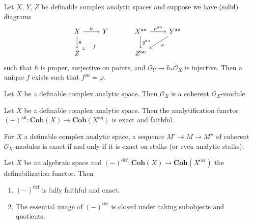 \documentclass[
	fontsize=10pt, %
]{kaohandt}
\newcommand{\definable}{\mathrm{def}}
\newcommand{\analytic}{\mathrm{an}}
\begin{document}
\begin{proposition}
    Let $X$, $Y$, $Z$ be definable complex analytic spaces and
    suppose we have (solid) diagrams
    \[
    \begin{tikzcd}
        X \ar[r,"h"] \ar[d,"g"] & Y\ar[dl,"f",dotted] \\ Z 
    \end{tikzcd}
    \hspace*{30pt}
    \begin{tikzcd}
        X^{\analytic} \ar[r,"h^{\analytic}"] \ar[d,"g^{\analytic}"] & Y^{\analytic}\ar[dl,"\varphi"] \\ Z^{\analytic} 
    \end{tikzcd}
    \]
    such that $h$ is proper, surjective on points,
    and $\mathcal{O}_Y \to h_*\mathcal{O}_X$ is injective.
    Then a unique $f$ exists such that $f^{\analytic} = \varphi$.
\end{proposition}

\begin{theorem}
    Let $X$ be a definable complex analytic space.
    Then $\mathcal{O}_X$ is a coherent $\mathcal{O}_X$-module.
\end{theorem}

\begin{theorem}
    Let $X$ be a definable complex analytic space.
    Then the analytification functor 
    $(-)^{\analytic}: \mathbf{Coh}(X) \to \mathbf{Coh}(X^{\analytic})$ is exact and faithful.
\end{theorem}

\begin{corollary}
    For $X$ a definable complex analytic space,
    a sequence $M' \to M \to M''$ of coherent $\mathcal{O}_X$-modules
    is exact if and only if it is exact on stalks (or even analytic stalks).
\end{corollary}

\begin{theorem}
    Let $X$ be an algebraic space and 
    $(-)^{\definable} : \mathbf{Coh}(X) \to \mathbf{Coh}(X^{\definable})$ the definabilization functor.
    Then 
    \begin{enumerate}[label = {(\arabic*)}]
        \item $(-)^{\definable}$ is fully faithful and exact.
        \item The essential image of $(-)^{\definable}$ is closed under taking subobjects and quotients.
    \end{enumerate}
\end{theorem}
\end{document}
